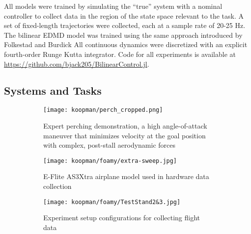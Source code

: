 \documentclass[../root.tex]{subfiles}
\begin{document}
All models were trained by simulating the ``true'' system with a nominal
controller to collect data in the region of the state space relevant to the
task. A set of fixed-length trajectories were collected, each at a sample rate
of 20-25 Hz. The bilinear EDMD model was trained using the same approach
introduced by Folkestad and Burdick \cite{folkestad_Koopman_2021}  All continuous dynamics
were discretized with an explicit fourth-order Runge Kutta integrator. Code for
all experiments is available at \url{https://github.com/bjack205/BilinearControl.jl}.

\subsection{Systems and Tasks}

\begin{figure}
    \begin{subfigure}{\linewidth}
        \centering
        \texttt{[image: koopman/perch\_cropped.png]}
        \caption{Expert perching demonstration, a high angle-of-attack maneuver that minimizes 
                velocity at the goal position with complex, post-stall aerodynamic forces}
        \label{fig:perch}
    \end{subfigure}
    \par\medskip
    \begin{subfigure}{.4\linewidth}
        \centering
        \texttt{[image: koopman/foamy/extra-sweep.jpg]}
        \caption{E-Flite AS3Xtra airplane model used in hardware data collection}
        \label{fig:hw1}
    \end{subfigure}%
    \hfill
    \begin{subfigure}{.52\linewidth}
        \centering
        \texttt{[image: koopman/foamy/TestStand2\&3.jpg]}
        \caption{Experiment setup configurations for collecting flight data}
        \label{fig:hw2}
    \end{subfigure}\\[1ex]
    \caption{}
    \label{fig:test}
\end{figure}
\end{document}
